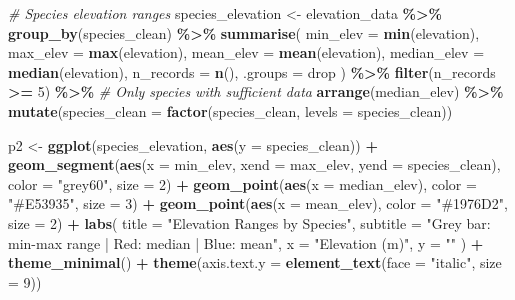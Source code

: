 \documentclass[
]{article}
\newenvironment{Shaded}{\begin{snugshade}}{\end{snugshade}}
\newcommand{\AttributeTok}[1]{\textcolor[rgb]{0.13,0.29,0.53}{#1}}
\newcommand{\CommentTok}[1]{\textcolor[rgb]{0.56,0.35,0.01}{\textit{#1}}}
\newcommand{\DecValTok}[1]{\textcolor[rgb]{0.00,0.00,0.81}{#1}}
\newcommand{\FunctionTok}[1]{\textcolor[rgb]{0.13,0.29,0.53}{\textbf{#1}}}
\newcommand{\NormalTok}[1]{#1}
\newcommand{\OtherTok}[1]{\textcolor[rgb]{0.56,0.35,0.01}{#1}}
\newcommand{\SpecialCharTok}[1]{\textcolor[rgb]{0.81,0.36,0.00}{\textbf{#1}}}
\newcommand{\StringTok}[1]{\textcolor[rgb]{0.31,0.60,0.02}{#1}}
\begin{document}
\begin{Shaded}
\begin{Highlighting}[]
  \CommentTok{\# Species elevation ranges}
\NormalTok{  species\_elevation }\OtherTok{\textless{}{-}}\NormalTok{ elevation\_data }\SpecialCharTok{\%\textgreater{}\%}
    \FunctionTok{group\_by}\NormalTok{(species\_clean) }\SpecialCharTok{\%\textgreater{}\%}
    \FunctionTok{summarise}\NormalTok{(}
      \AttributeTok{min\_elev =} \FunctionTok{min}\NormalTok{(elevation),}
      \AttributeTok{max\_elev =} \FunctionTok{max}\NormalTok{(elevation),}
      \AttributeTok{mean\_elev =} \FunctionTok{mean}\NormalTok{(elevation),}
      \AttributeTok{median\_elev =} \FunctionTok{median}\NormalTok{(elevation),}
      \AttributeTok{n\_records =} \FunctionTok{n}\NormalTok{(),}
      \AttributeTok{.groups =} \StringTok{\textquotesingle{}drop\textquotesingle{}}
\NormalTok{    ) }\SpecialCharTok{\%\textgreater{}\%}
    \FunctionTok{filter}\NormalTok{(n\_records }\SpecialCharTok{\textgreater{}=} \DecValTok{5}\NormalTok{) }\SpecialCharTok{\%\textgreater{}\%}  \CommentTok{\# Only species with sufficient data}
    \FunctionTok{arrange}\NormalTok{(median\_elev) }\SpecialCharTok{\%\textgreater{}\%}
    \FunctionTok{mutate}\NormalTok{(}\AttributeTok{species\_clean =} \FunctionTok{factor}\NormalTok{(species\_clean, }\AttributeTok{levels =}\NormalTok{ species\_clean))}
  
\NormalTok{  p2 }\OtherTok{\textless{}{-}} \FunctionTok{ggplot}\NormalTok{(species\_elevation, }\FunctionTok{aes}\NormalTok{(}\AttributeTok{y =}\NormalTok{ species\_clean)) }\SpecialCharTok{+}
    \FunctionTok{geom\_segment}\NormalTok{(}\FunctionTok{aes}\NormalTok{(}\AttributeTok{x =}\NormalTok{ min\_elev, }\AttributeTok{xend =}\NormalTok{ max\_elev, }\AttributeTok{yend =}\NormalTok{ species\_clean),}
                 \AttributeTok{color =} \StringTok{"grey60"}\NormalTok{, }\AttributeTok{size =} \DecValTok{2}\NormalTok{) }\SpecialCharTok{+}
    \FunctionTok{geom\_point}\NormalTok{(}\FunctionTok{aes}\NormalTok{(}\AttributeTok{x =}\NormalTok{ median\_elev), }\AttributeTok{color =} \StringTok{"\#E53935"}\NormalTok{, }\AttributeTok{size =} \DecValTok{3}\NormalTok{) }\SpecialCharTok{+}
    \FunctionTok{geom\_point}\NormalTok{(}\FunctionTok{aes}\NormalTok{(}\AttributeTok{x =}\NormalTok{ mean\_elev), }\AttributeTok{color =} \StringTok{"\#1976D2"}\NormalTok{, }\AttributeTok{size =} \DecValTok{2}\NormalTok{) }\SpecialCharTok{+}
    \FunctionTok{labs}\NormalTok{(}
      \AttributeTok{title =} \StringTok{"Elevation Ranges by Species"}\NormalTok{,}
      \AttributeTok{subtitle =} \StringTok{"Grey bar: min{-}max range | Red: median | Blue: mean"}\NormalTok{,}
      \AttributeTok{x =} \StringTok{"Elevation (m)"}\NormalTok{, }\AttributeTok{y =} \StringTok{""}
\NormalTok{    ) }\SpecialCharTok{+}
    \FunctionTok{theme\_minimal}\NormalTok{() }\SpecialCharTok{+}
    \FunctionTok{theme}\NormalTok{(}\AttributeTok{axis.text.y =} \FunctionTok{element\_text}\NormalTok{(}\AttributeTok{face =} \StringTok{"italic"}\NormalTok{, }\AttributeTok{size =} \DecValTok{9}\NormalTok{))}
  

\end{Highlighting}
\end{Shaded}
\end{document}

